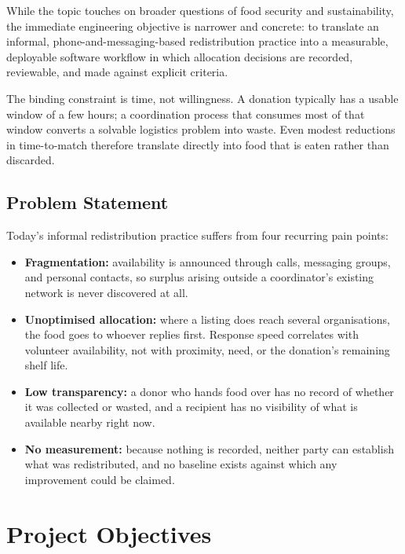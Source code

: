 \documentclass[12pt,a4paper]{report}
\begin{document}
While the topic touches on broader questions of food security and sustainability, the immediate engineering objective is narrower and concrete: to translate an informal, phone-and-messaging-based redistribution practice into a measurable, deployable software workflow in which allocation decisions are recorded, reviewable, and made against explicit criteria.

The binding constraint is time, not willingness. A donation typically has a usable window of a few hours; a coordination process that consumes most of that window converts a solvable logistics problem into waste. Even modest reductions in time-to-match therefore translate directly into food that is eaten rather than discarded.

\subsection{Problem Statement}

Today's informal redistribution practice suffers from four recurring pain points:

\begin{itemize}[leftmargin=*]
    \item \textbf{Fragmentation:} availability is announced through calls, messaging groups, and personal contacts, so surplus arising outside a coordinator's existing network is never discovered at all.
    \item \textbf{Unoptimised allocation:} where a listing does reach several organisations, the food goes to whoever replies first. Response speed correlates with volunteer availability, not with proximity, need, or the donation's remaining shelf life.
    \item \textbf{Low transparency:} a donor who hands food over has no record of whether it was collected or wasted, and a recipient has no visibility of what is available nearby right now.
    \item \textbf{No measurement:} because nothing is recorded, neither party can establish what was redistributed, and no baseline exists against which any improvement could be claimed.
\end{itemize}

\section{Project Objectives}
\end{document}
